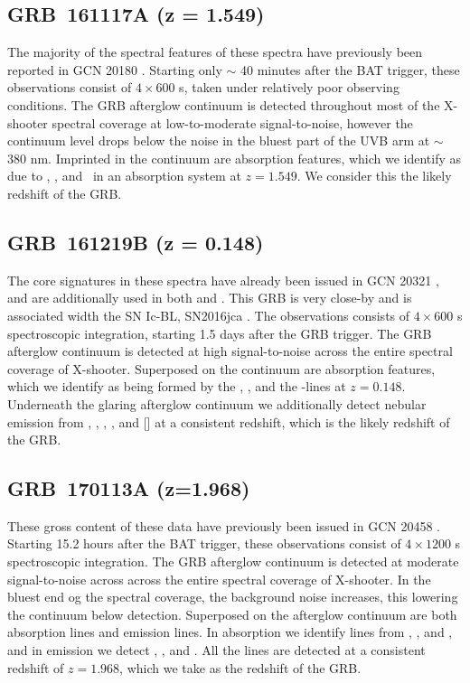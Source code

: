 \documentclass{aa}    %
\begin{document}
\subsection{GRB~161117A (z = 1.549)}\label{161117}

The majority of the spectral features of these spectra have previously been
reported in GCN 20180 \citep{GCN20180}. Starting only $\sim$ 40 minutes after
the BAT trigger, these observations consist of $4 \times 600$ s, taken under
relatively poor observing conditions. The GRB afterglow continuum is detected
throughout most of the X-shooter spectral coverage at low-to-moderate
signal-to-noise, however the continuum level drops below the noise in the bluest
part of the UVB arm at $\sim$ 380 nm. Imprinted in the continuum are
absorption features, which we identify as due to \feii, \mgii, and \mgi~in an
absorption system at $z = 1.549$. We consider this the likely redshift of the
GRB.

\subsection{GRB~161219B (z = 0.148)}\label{161219}

The core signatures in these spectra have already been issued in GCN 20321
\citep{GCN20321}, and are additionally used in both \citet{Ashall2017} and
\citet{Cano2017}. This GRB is very close-by and is associated width the SN
Ic-BL, SN2016jca \citep[GCN 20342;][]{GCN20342}. The observations consists of $4
\times 600$ s spectroscopic integration, starting 1.5 days after the GRB
trigger. The GRB afterglow continuum is detected at high signal-to-noise across
the entire spectral coverage of X-shooter. Superposed on the continuum are
absorption features, which we identify as being formed by the \mgii, \mgi, and
the \cahk-lines at $z = 0.148$. Underneath the glaring afterglow continuum we
additionally detect nebular emission from \oii, \hb, \oiii, \ha, and [\sii] at a
consistent redshift, which is the likely redshift of the GRB.


\subsection{GRB~170113A (z=1.968)}\label{170113}

These gross content of these data have previously been issued in GCN 20458
\citep{GCN20458}. Starting 15.2 hours after the BAT trigger, these observations
consist of $4 \times 1200$ s spectroscopic integration. The GRB afterglow
continuum is detected at moderate signal-to-noise across across the entire
spectral coverage of X-shooter. In the bluest end og the spectral coverage, the
background noise increases, this lowering the continuum below detection.
Superposed on the afterglow continuum are both absorption lines and emission
lines. In absorption we identify lines from \SIii, \feii, and \mgii, and in
emission we detect \oii, \hb, and \oiii. All the lines are detected at a
consistent redshift of $z=1.968$, which we take as the redshift of the GRB.
\end{document}
